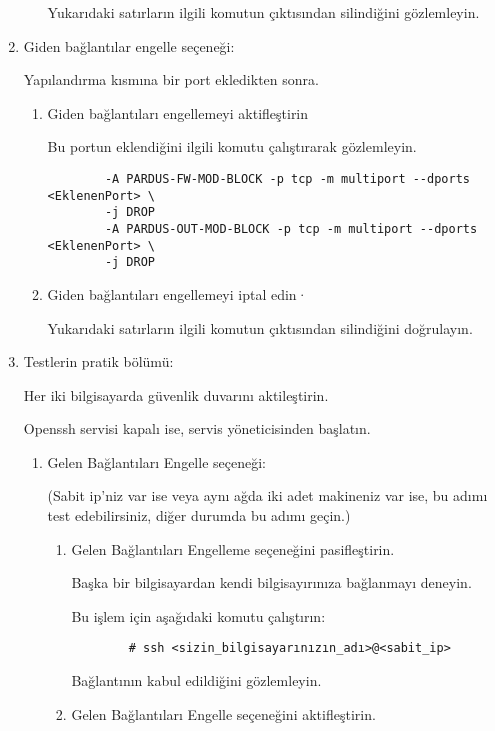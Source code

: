 \documentclass[a4paper,10pt]{article}
\begin{document}
\begin{enumerate}
\begin{enumerate}
    	Yukarıdaki satırların ilgili komutun çıktısından silindiğini gözlemleyin.
    \end{enumerate}

\item Giden bağlantılar engelle seçeneği: 

Yapılandırma kısmına bir port ekledikten sonra.
        \begin{enumerate}
        \item Giden bağlantıları engellemeyi aktifleştirin

            Bu portun eklendiğini ilgili komutu çalıştırarak gözlemleyin.
		\begin{verbatim}
		-A PARDUS-FW-MOD-BLOCK -p tcp -m multiport --dports <EklenenPort> \
		-j DROP
		-A PARDUS-OUT-MOD-BLOCK -p tcp -m multiport --dports <EklenenPort> \
		-j DROP
		\end{verbatim} 

        \item Giden bağlantıları engellemeyi iptal edin·

              Yukarıdaki satırların ilgili komutun çıktısından silindiğini doğrulayın.
        \end{enumerate}

\item Testlerin pratik bölümü:

	Her iki bilgisayarda güvenlik duvarını aktileştirin.

    	Openssh servisi kapalı ise, servis yöneticisinden başlatın.
\begin{enumerate}
    \item Gelen Bağlantıları Engelle seçeneği: 
	
	(Sabit ip'niz var ise veya aynı ağda iki adet makineniz var ise, bu adımı test edebilirsiniz, diğer durumda bu adımı geçin.)
    \begin{enumerate}
        \item Gelen Bağlantıları Engelleme seçeneğini pasifleştirin.

              Başka bir bilgisayardan kendi bilgisayırınıza bağlanmayı deneyin.

              Bu işlem için aşağıdaki komutu çalıştırın:
		\begin{verbatim}
		# ssh <sizin_bilgisayarınızın_adı>@<sabit_ip>
		\end{verbatim} 
              Bağlantının kabul edildiğini gözlemleyin.

        \item Gelen Bağlantıları Engelle seçeneğini aktifleştirin.


\end{enumerate}
\end{enumerate}
\end{enumerate}
\end{document}
